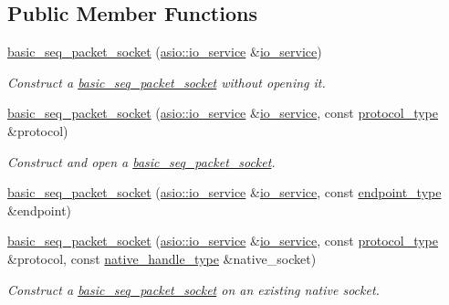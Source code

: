 \subsection*{Public Member Functions}
\begin{DoxyCompactItemize}
\item 
\hyperlink{classasio_1_1basic__seq__packet__socket_acc332bb6829a9e2ec9621da90d2e6701}{basic\+\_\+seq\+\_\+packet\+\_\+socket} (\hyperlink{classasio_1_1io__service}{asio\+::io\+\_\+service} \&\hyperlink{classasio_1_1io__service}{io\+\_\+service})
\begin{DoxyCompactList}\small\item\em Construct a \hyperlink{classasio_1_1basic__seq__packet__socket}{basic\+\_\+seq\+\_\+packet\+\_\+socket} without opening it. \end{DoxyCompactList}\item 
\hyperlink{classasio_1_1basic__seq__packet__socket_a9f718586b2c5a304f1f0664df80aa800}{basic\+\_\+seq\+\_\+packet\+\_\+socket} (\hyperlink{classasio_1_1io__service}{asio\+::io\+\_\+service} \&\hyperlink{classasio_1_1io__service}{io\+\_\+service}, const \hyperlink{classasio_1_1basic__seq__packet__socket_a683a8578f6465370482fd9f3b51ac0ea}{protocol\+\_\+type} \&protocol)
\begin{DoxyCompactList}\small\item\em Construct and open a \hyperlink{classasio_1_1basic__seq__packet__socket}{basic\+\_\+seq\+\_\+packet\+\_\+socket}. \end{DoxyCompactList}\item 
\hyperlink{classasio_1_1basic__seq__packet__socket_a28d81d34e01f55be63e4261ff911096d}{basic\+\_\+seq\+\_\+packet\+\_\+socket} (\hyperlink{classasio_1_1io__service}{asio\+::io\+\_\+service} \&\hyperlink{classasio_1_1io__service}{io\+\_\+service}, const \hyperlink{classasio_1_1basic__seq__packet__socket_ad5f8549d940cf2c9325b02398910e98f}{endpoint\+\_\+type} \&endpoint)
\item 
\hyperlink{classasio_1_1basic__seq__packet__socket_acd45844c603161c15f63e44c21afc9e5}{basic\+\_\+seq\+\_\+packet\+\_\+socket} (\hyperlink{classasio_1_1io__service}{asio\+::io\+\_\+service} \&\hyperlink{classasio_1_1io__service}{io\+\_\+service}, const \hyperlink{classasio_1_1basic__seq__packet__socket_a683a8578f6465370482fd9f3b51ac0ea}{protocol\+\_\+type} \&protocol, const \hyperlink{classasio_1_1basic__seq__packet__socket_aab4f35462c8d5eecf380d50336984ccd}{native\+\_\+handle\+\_\+type} \&native\+\_\+socket)
\begin{DoxyCompactList}\small\item\em Construct a \hyperlink{classasio_1_1basic__seq__packet__socket}{basic\+\_\+seq\+\_\+packet\+\_\+socket} on an existing native socket. \end{DoxyCompactList}\item 

\end{DoxyCompactItemize}
